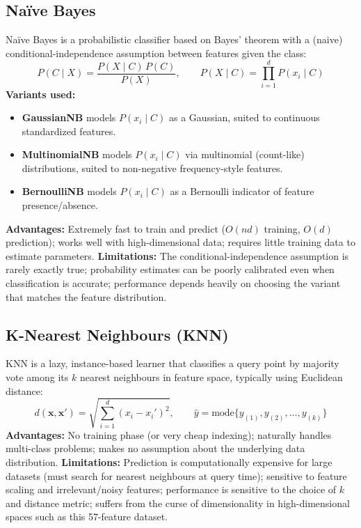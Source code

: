\documentclass[12pt,a4paper]{article}
\begin{document}
\subsection*{Na\"ive Bayes}
Na\"ive Bayes is a probabilistic classifier based on Bayes' theorem with a (naive) conditional-independence assumption between features given the class:
\[
P(C \mid X) = \frac{P(X \mid C)\,P(C)}{P(X)}, \qquad
P(X\mid C) = \prod_{i=1}^{d} P(x_i \mid C)
\]
\textbf{Variants used:}
\begin{itemize}
\item \textbf{GaussianNB} models $P(x_i \mid C)$ as a Gaussian, suited to continuous standardized features.
\item \textbf{MultinomialNB} models $P(x_i \mid C)$ via multinomial (count-like) distributions, suited to non-negative frequency-style features.
\item \textbf{BernoulliNB} models $P(x_i \mid C)$ as a Bernoulli indicator of feature presence/absence.
\end{itemize}
\textbf{Advantages:} Extremely fast to train and predict ($O(nd)$ training, $O(d)$ prediction); works well with high-dimensional data; requires little training data to estimate parameters.
\textbf{Limitations:} The conditional-independence assumption is rarely exactly true; probability estimates can be poorly calibrated even when classification is accurate; performance depends heavily on choosing the variant that matches the feature distribution.

\subsection*{K-Nearest Neighbours (KNN)}
KNN is a lazy, instance-based learner that classifies a query point by majority vote among its $k$ nearest neighbours in feature space, typically using Euclidean distance:
\[
d(\mathbf{x},\mathbf{x}') = \sqrt{\sum_{i=1}^{d}(x_i - x_i')^2}, \qquad
\hat{y} = \text{mode}\{y_{(1)}, y_{(2)}, \dots, y_{(k)}\}
\]
\textbf{Advantages:} No training phase (or very cheap indexing); naturally handles multi-class problems; makes no assumption about the underlying data distribution.
\textbf{Limitations:} Prediction is computationally expensive for large datasets (must search for nearest neighbours at query time); sensitive to feature scaling and irrelevant/noisy features; performance is sensitive to the choice of $k$ and distance metric; suffers from the curse of dimensionality in high-dimensional spaces such as this 57-feature dataset.
\end{document}
